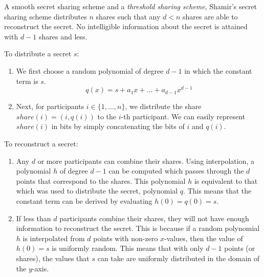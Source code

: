 \begin{definition} \label{def:sss}
 A smooth secret sharing scheme and a \textit{threshold sharing scheme}, Shamir's secret sharing scheme distributes $n$ shares such that any $d < n$ shares are able to reconstruct the secret. No intelligible information about the secret is attained with $d-1$ shares and less.

 To distribute a secret $s$:
\begin{enumerate}
    \item We first choose a random polynomial of degree $d - 1$ in which the constant term is $s$. 
    $$
    q(x) = s + a_1x + \ldots + a_{d-1}x^{d-1}
    $$
    \item Next, for participants $i \in \{1, \ldots, n\}$, we distribute the share $share(i) = (i, q(i))$ 
    to the $i$-th participant. We can easily represent $share(i)$ in bits by simply concatenating 
    the bits of $i$ and $q(i)$.
\end{enumerate}

To reconstruct a secret:
\begin{enumerate}
    \item Any $d$ or more participants can combine their shares. Using interpolation, a
    polynomial $h$ of degree $d - 1$ can be computed which passes through the $d$ points that 
    correspond to the shares. This polynomial $h$ is equivalent to that which was used to 
    distribute the secret, polynomial $q$. This means that the constant term can be derived by 
    evaluating $h(0) = q(0) = s$.
    \item If less than $d$ participants combine their shares, they will not have enough information 
    to reconstruct the secret. This is because if a random polynomial $h$ is interpolated from 
    $d$ points with non-zero $x$-values, then the value of $h(0) = s$ is uniformly random. This means
    that with only $d-1$ points (or shares), the values that $s$ can take are uniformly distributed
    in the domain of the $y$-axis. 
\end{enumerate}
\end{definition}

